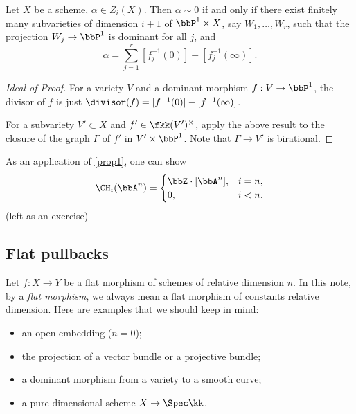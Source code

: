     \begin{proposition}\label{prop1}
        Let \(X\) be a scheme, \(\alpha \in Z_i(X)\).
        Then \(\alpha \sim 0\) if and only if there exist finitely many subvarieties of dimension \(i+1\) of \(\bbP^1 \times X\), say \(W_1, \ldots, W_r\), 
        such that the projection \(W_j \to \bbP^1\) is dominant for all \(j\), and
        \[ \alpha = \sum_{j=1}^r [f_j^{-1}(0)] - [f_j^{-1}(\infty)]. \]
    \end{proposition}
    \begin{proof}[Ideal of Proof]
        For a variety \(V\) and a dominant morphism \(f : V \to \bbP^1\), the divisor of \(f\) is just \(\divisor(f) = [f^{-1}(0)] - [f^{-1}(\infty)]\).

        For a subvariety \(V' \subset X\) and \(f' \in \fkk(V')^\times\), apply the above result to the closure of the graph \(\Gamma\) of \(f'\) in \(V' \times \bbP^1\).
        Note that \(\Gamma \to V'\) is birational.
    \end{proof}

    \begin{example}
        As an application of \cref{prop1}, one can show 
        \[ \CH_i(\bbA^n) = \begin{cases}
            \bbZ\cdot[\bbA^n], & i = n, \\
            0, & i < n.
        \end{cases} \]
        (left as an exercise)
    \end{example}

\subsection{Flat pullbacks}
    
    Let \(f : X \to Y\) be a flat morphism of schemes of relative dimension \(n\).
    In this note, by a \emph{flat morphism}, we always mean a flat morphism of constants relative dimension.
    Here are examples that we should keep in mind:
    \begin{itemize}
        \item an open embedding (\(n=0\));
        \item the projection of a vector bundle or a projective bundle;
        \item a dominant morphism from a variety to a smooth curve;
        \item a pure-dimensional scheme \(X \to \Spec \kk\).
    \end{itemize}


